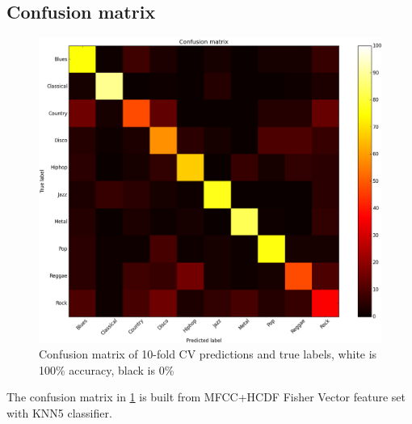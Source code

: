 \subsection{Confusion matrix}
\begin{figure}
	\includegraphics[width=\textwidth]{confusion_matrix.png}
	\caption{Confusion matrix of 10-fold CV predictions and true labels, white is 100\% accuracy, black is 0\%}
	\label{fig:confusion}
\end{figure}
The confusion matrix in \ref{fig:confusion} is built from MFCC+HCDF Fisher Vector feature set with KNN5 classifier.
